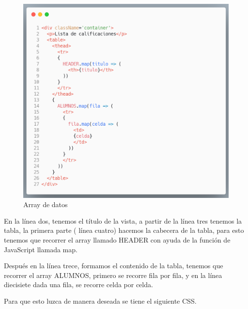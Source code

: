  \newline
     \begin{figure}[H]
    \includegraphics[width=1\textwidth]{./Imagenes/table-react.png}
     \caption[Crear nuevos directorios]{Array de datos}
         \end{figure}
    \newline
    
    En la línea dos, tenemos el título de la vista, a partir de la línea tres tenemos la tabla, la primera parte ( línea cuatro) hacemos la cabecera de la tabla, para esto tenemos que recorrer el array llamado HEADER con ayuda de la función de JavaScript llamada map.

Después en la línea trece, formamos el contenido de la tabla, tenemos que recorrer el array ALUMNOS, primero se recorre fila por fila, y en la línea diecisiete dada una fila, se recorre celda por celda.

Para que esto luzca de manera deseada se tiene el siguiente CSS.

